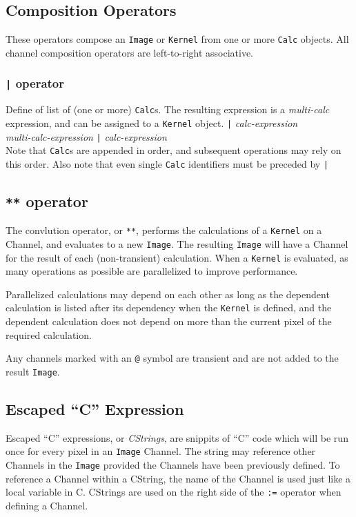 \subsection{Composition Operators}
\label{ssec:compositionops}
These operators compose an \texttt{Image} or \texttt{Kernel} from one
or more \texttt{Calc} objects.
All channel composition operators are left-to-right associative.

\subsubsection{\texttt{|} operator}
\label{sssec:barop}
Define of list of (one or more) \texttt{Calc}s. The resulting expression is a
\emph{multi-calc} expression, and can be assigned
to a \texttt{Kernel} object.
\startsyn
\texttt{|} \emph{calc-expression} \\
\emph{multi-calc-expression} \texttt{|} \emph{calc-expression} \\
\stopsyn
Note that \texttt{Calc}s are appended in order, and
subsequent operations may rely on this order.
Also note that even single \texttt{Calc} identifiers must be preceded by \texttt{|}

\subsection{\texttt{**} operator}
\label{ssec:convolutionop}

The convlution operator, or \texttt{**}, performs the calculations of a
\texttt{Kernel} on a Channel, and evaluates to a new \texttt{Image}. The
resulting \texttt{Image} will have a Channel for the result of each
(non-transient) calculation.
When a \texttt{Kernel} is evaluated, as many operations as possible are
parallelized to improve performance.

Parallelized calculations may depend on each other as long as the
dependent calculation is listed after its dependency when the \texttt{Kernel} is
defined, and the dependent calculation does not depend on more than
the current pixel of the required calculation.

Any channels marked with an \texttt{@} symbol are transient and
are not added to the result \texttt{Image}.

\subsection{Escaped ``C'' Expression}
\label{ssec:escapedC}

Escaped ``C'' expressions, or \emph{CStrings}, are snippits of ``C'' code
which will be run once for every pixel in an \texttt{Image} Channel. The
string may reference other Channels in the \texttt{Image} provided the
Channels have been previously defined. To reference a Channel within a
CString, the name of the Channel is used just like a local variable in C.
CStrings are used on the right side
of the \texttt{:=} operator when defining a Channel.

